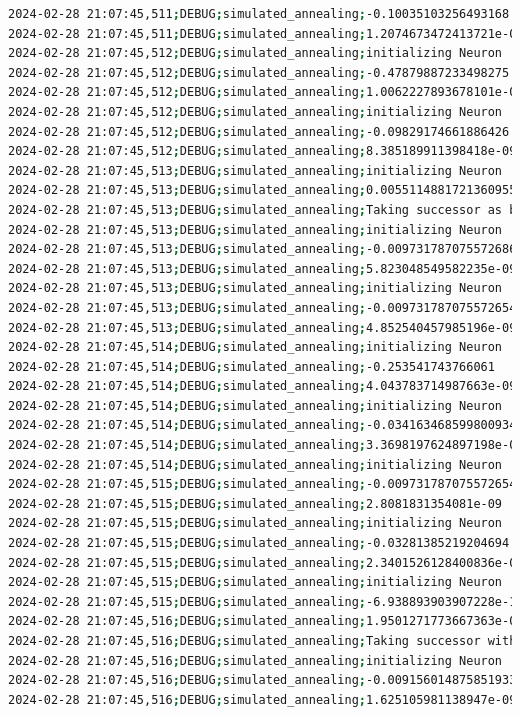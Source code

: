 \documentclass{article}
\begin{document}
\begin{lstlisting}[language=bash, caption=Example Output of Program]
2024-02-28 21:07:45,511;DEBUG;simulated_annealing;-0.10035103256493168
2024-02-28 21:07:45,511;DEBUG;simulated_annealing;1.2074673472413721e-08
2024-02-28 21:07:45,512;DEBUG;simulated_annealing;initializing Neuron
2024-02-28 21:07:45,512;DEBUG;simulated_annealing;-0.47879887233498275
2024-02-28 21:07:45,512;DEBUG;simulated_annealing;1.0062227893678101e-08
2024-02-28 21:07:45,512;DEBUG;simulated_annealing;initializing Neuron
2024-02-28 21:07:45,512;DEBUG;simulated_annealing;-0.09829174661886426
2024-02-28 21:07:45,512;DEBUG;simulated_annealing;8.385189911398418e-09
2024-02-28 21:07:45,513;DEBUG;simulated_annealing;initializing Neuron
2024-02-28 21:07:45,513;DEBUG;simulated_annealing;0.0055114881721360955
2024-02-28 21:07:45,513;DEBUG;simulated_annealing;Taking successor as better option (exploitation)
2024-02-28 21:07:45,513;DEBUG;simulated_annealing;initializing Neuron
2024-02-28 21:07:45,513;DEBUG;simulated_annealing;-0.009731787075572686
2024-02-28 21:07:45,513;DEBUG;simulated_annealing;5.823048549582235e-09
2024-02-28 21:07:45,513;DEBUG;simulated_annealing;initializing Neuron
2024-02-28 21:07:45,513;DEBUG;simulated_annealing;-0.009731787075572654
2024-02-28 21:07:45,513;DEBUG;simulated_annealing;4.852540457985196e-09
2024-02-28 21:07:45,514;DEBUG;simulated_annealing;initializing Neuron
2024-02-28 21:07:45,514;DEBUG;simulated_annealing;-0.253541743766061
2024-02-28 21:07:45,514;DEBUG;simulated_annealing;4.043783714987663e-09
2024-02-28 21:07:45,514;DEBUG;simulated_annealing;initializing Neuron
2024-02-28 21:07:45,514;DEBUG;simulated_annealing;-0.034163468599800934
2024-02-28 21:07:45,514;DEBUG;simulated_annealing;3.3698197624897198e-09
2024-02-28 21:07:45,514;DEBUG;simulated_annealing;initializing Neuron
2024-02-28 21:07:45,515;DEBUG;simulated_annealing;-0.009731787075572654
2024-02-28 21:07:45,515;DEBUG;simulated_annealing;2.8081831354081e-09
2024-02-28 21:07:45,515;DEBUG;simulated_annealing;initializing Neuron
2024-02-28 21:07:45,515;DEBUG;simulated_annealing;-0.03281385219204694
2024-02-28 21:07:45,515;DEBUG;simulated_annealing;2.3401526128400836e-09
2024-02-28 21:07:45,515;DEBUG;simulated_annealing;initializing Neuron
2024-02-28 21:07:45,515;DEBUG;simulated_annealing;-6.938893903907228e-18
2024-02-28 21:07:45,516;DEBUG;simulated_annealing;1.9501271773667363e-09
2024-02-28 21:07:45,516;DEBUG;simulated_annealing;Taking successor with probability 99% (exploration)
2024-02-28 21:07:45,516;DEBUG;simulated_annealing;initializing Neuron
2024-02-28 21:07:45,516;DEBUG;simulated_annealing;-0.009156014875851933
2024-02-28 21:07:45,516;DEBUG;simulated_annealing;1.625105981138947e-09

\end{lstlisting}
\end{document}
